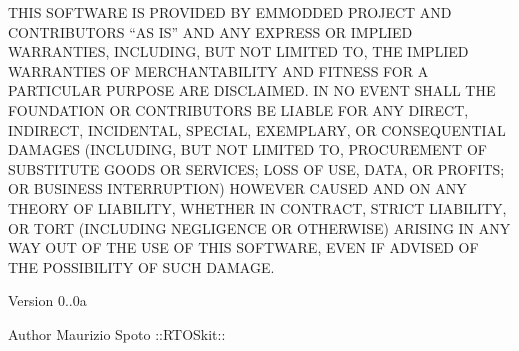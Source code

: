 \-T\-H\-I\-S \-S\-O\-F\-T\-W\-A\-R\-E \-I\-S \-P\-R\-O\-V\-I\-D\-E\-D \-B\-Y \-E\-M\-M\-O\-D\-D\-E\-D \-P\-R\-O\-J\-E\-C\-T \-A\-N\-D \-C\-O\-N\-T\-R\-I\-B\-U\-T\-O\-R\-S ``\-A\-S \-I\-S'' \-A\-N\-D \-A\-N\-Y \-E\-X\-P\-R\-E\-S\-S \-O\-R \-I\-M\-P\-L\-I\-E\-D \-W\-A\-R\-R\-A\-N\-T\-I\-E\-S, \-I\-N\-C\-L\-U\-D\-I\-N\-G, \-B\-U\-T \-N\-O\-T \-L\-I\-M\-I\-T\-E\-D \-T\-O, \-T\-H\-E \-I\-M\-P\-L\-I\-E\-D \-W\-A\-R\-R\-A\-N\-T\-I\-E\-S \-O\-F \-M\-E\-R\-C\-H\-A\-N\-T\-A\-B\-I\-L\-I\-T\-Y \-A\-N\-D \-F\-I\-T\-N\-E\-S\-S \-F\-O\-R \-A \-P\-A\-R\-T\-I\-C\-U\-L\-A\-R \-P\-U\-R\-P\-O\-S\-E \-A\-R\-E \-D\-I\-S\-C\-L\-A\-I\-M\-E\-D. \-I\-N \-N\-O \-E\-V\-E\-N\-T \-S\-H\-A\-L\-L \-T\-H\-E \-F\-O\-U\-N\-D\-A\-T\-I\-O\-N \-O\-R \-C\-O\-N\-T\-R\-I\-B\-U\-T\-O\-R\-S \-B\-E \-L\-I\-A\-B\-L\-E \-F\-O\-R \-A\-N\-Y \-D\-I\-R\-E\-C\-T, \-I\-N\-D\-I\-R\-E\-C\-T, \-I\-N\-C\-I\-D\-E\-N\-T\-A\-L, \-S\-P\-E\-C\-I\-A\-L, \-E\-X\-E\-M\-P\-L\-A\-R\-Y, \-O\-R \-C\-O\-N\-S\-E\-Q\-U\-E\-N\-T\-I\-A\-L \-D\-A\-M\-A\-G\-E\-S (\-I\-N\-C\-L\-U\-D\-I\-N\-G, \-B\-U\-T \-N\-O\-T \-L\-I\-M\-I\-T\-E\-D \-T\-O, \-P\-R\-O\-C\-U\-R\-E\-M\-E\-N\-T \-O\-F \-S\-U\-B\-S\-T\-I\-T\-U\-T\-E \-G\-O\-O\-D\-S \-O\-R \-S\-E\-R\-V\-I\-C\-E\-S; \-L\-O\-S\-S \-O\-F \-U\-S\-E, \-D\-A\-T\-A, \-O\-R \-P\-R\-O\-F\-I\-T\-S; \-O\-R \-B\-U\-S\-I\-N\-E\-S\-S \-I\-N\-T\-E\-R\-R\-U\-P\-T\-I\-O\-N) \-H\-O\-W\-E\-V\-E\-R \-C\-A\-U\-S\-E\-D \-A\-N\-D \-O\-N \-A\-N\-Y \-T\-H\-E\-O\-R\-Y \-O\-F \-L\-I\-A\-B\-I\-L\-I\-T\-Y, \-W\-H\-E\-T\-H\-E\-R \-I\-N \-C\-O\-N\-T\-R\-A\-C\-T, \-S\-T\-R\-I\-C\-T \-L\-I\-A\-B\-I\-L\-I\-T\-Y, \-O\-R \-T\-O\-R\-T (\-I\-N\-C\-L\-U\-D\-I\-N\-G \-N\-E\-G\-L\-I\-G\-E\-N\-C\-E \-O\-R \-O\-T\-H\-E\-R\-W\-I\-S\-E) \-A\-R\-I\-S\-I\-N\-G \-I\-N \-A\-N\-Y \-W\-A\-Y \-O\-U\-T \-O\-F \-T\-H\-E \-U\-S\-E \-O\-F \-T\-H\-I\-S \-S\-O\-F\-T\-W\-A\-R\-E, \-E\-V\-E\-N \-I\-F \-A\-D\-V\-I\-S\-E\-D \-O\-F \-T\-H\-E \-P\-O\-S\-S\-I\-B\-I\-L\-I\-T\-Y \-O\-F \-S\-U\-C\-H \-D\-A\-M\-A\-G\-E.

\begin{DoxyVersion}{\-Version}
0..\-0a 
\end{DoxyVersion}
\begin{DoxyAuthor}{\-Author}
\-Maurizio \-Spoto \-::\-R\-T\-O\-Skit\-:\-: 
\end{DoxyAuthor}
